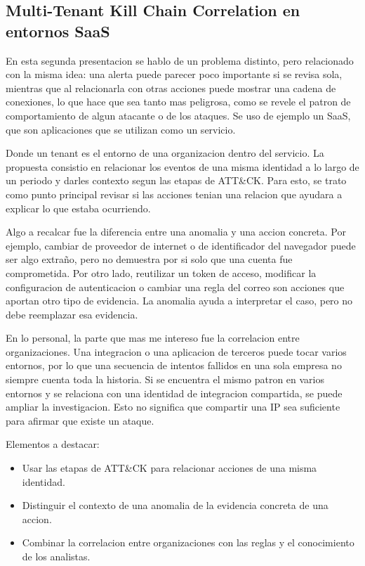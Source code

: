 \documentclass[letterpaper,12pt]{article}
\begin{document}
\subsection{Multi-Tenant Kill Chain Correlation en entornos SaaS}

En esta segunda presentacion se hablo de un problema distinto,
pero relacionado con la misma idea: una alerta puede parecer poco
importante si se revisa sola, mientras que al relacionarla con
otras acciones puede mostrar una cadena de conexiones, lo que hace que 
sea tanto mas peligrosa, como se revele el patron de comportamiento 
de algun atacante o de los ataques. Se uso de ejemplo un SaaS, 
que son aplicaciones que se
utilizan como un servicio.

Donde un tenant es el entorno de una organizacion dentro del
servicio. La propuesta consistio en relacionar los eventos de una
misma identidad a lo largo de un periodo y darles contexto segun
las etapas de ATT\&CK. Para esto, se trato como punto principal
revisar si las acciones tenian una relacion
que ayudara a explicar lo que estaba ocurriendo.

Algo a recalcar fue la diferencia entre una anomalia y una accion
concreta. Por ejemplo, cambiar de proveedor de internet o de
identificador del navegador puede ser algo extraño, pero no
demuestra por si solo que una cuenta fue comprometida. Por otro
lado, reutilizar un token de acceso, modificar la configuracion
de autenticacion o cambiar una regla del correo son acciones que
aportan otro tipo de evidencia. La anomalia ayuda a interpretar
el caso, pero no debe reemplazar esa evidencia.

En lo personal, la parte que mas me intereso fue la correlacion
entre organizaciones. Una integracion o una aplicacion de
terceros puede tocar varios entornos, por lo que una secuencia de
intentos fallidos en una sola empresa no siempre cuenta toda la
historia. Si se encuentra el mismo patron en varios entornos y se
relaciona con una identidad de integracion compartida, se puede
ampliar la investigacion. Esto no significa que compartir una IP
sea suficiente para afirmar que existe un ataque.

Elementos a destacar:

\begin{itemize}
    \item Usar las etapas de ATT\&CK para relacionar acciones de una misma identidad.
    \item Distinguir el contexto de una anomalia de la evidencia concreta de una accion.
    \item Combinar la correlacion entre organizaciones con las reglas y el conocimiento de los analistas.
\end{itemize}
\end{document}
